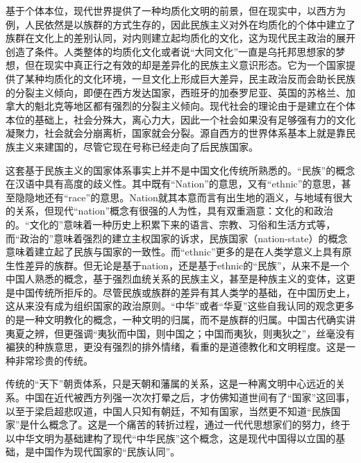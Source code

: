 \documentclass[UTF8, 12pt, a4paper]{ctexrep}
\begin{document}
基于个体本位，现代世界提供了一种均质化文明的前景，但在现实中，以西方为例，人民依然是以族群的方式生存的，因此民族主义对外在均质化的个体中建立了族群在文化上的差别认同，对内则建立起均质化的文化，这为现代民主政治的展开创造了条件。人类整体的均质化文化或者说“大同文化”一直是乌托邦思想家的梦想，但在现实中真正行之有效的却是差异化的民族主义意识形态。它为一个国家提供了某种均质化的文化环境，一旦文化上形成巨大差异，民主政治反而会助长民族的分裂主义倾向，即便在西方发达国家，西班牙的加泰罗尼亚、英国的苏格兰、加拿大的魁北克等地区都有强烈的分裂主义倾向。现代社会的理论由于是建立在个体本位的基础上，社会分殊大，离心力大，因此一个社会如果没有足够强有力的文化凝聚力，社会就会分崩离析，国家就会分裂。源自西方的世界体系基本上就是靠民族主义来建国的，尽管它现在号称已经走向了后民族国家。

这套基于民族主义的国家体系事实上并不是中国文化传统所熟悉的。“民族”的概念在汉语中具有高度的歧义性。其中既有“Nation”的意思，又有“ethnic”的意思，甚至隐隐地还有“race”的意思。Nation就其本意而言有出生地的涵义，与地域有很大的关系，但现代“nation”概念有很强的人为性，具有双重涵意：文化的和政治的。“文化的”意味着一种历史上积累下来的语言、宗教、习俗和生活方式等，而“政治的”意味着强烈的建立主权国家的诉求，民族国家（nation-state）的概念意味着建立起了民族与国家的一致性。而“ethnic”更多的是在人类学意义上具有原生性差异的族群。但无论是基于nation，还是基于ethnic的“民族”，从来不是一个中国人熟悉的概念，基于强烈血统关系的民族主义，甚至是种族主义的变体，这更是中国传统所拒斥的。尽管民族或族群的差异有其人类学的基础，在中国历史上，这从来没有成为组织国家的政治原则。“中华”或者“华夏”这些自我认同的观念更多的是一种文明教化的概念，一种文明的归属，而不是族群的归属。中国古代确实讲夷夏之辨，但更强调“夷狄而中国，则中国之；中国而夷狄，则夷狄之”，丝毫没有褊狭的种族意思，更没有强烈的排外情绪，看重的是道德教化和文明程度。这是一种非常珍贵的传统。

传统的“天下”朝贡体系，只是天朝和藩属的关系，这是一种离文明中心远近的关系。中国在近代被西方列强一次次打晕之后，才仿佛知道世间有了“国家”这回事，以至于梁启超悲叹道，中国人只知有朝廷，不知有国家，当然更不知道“民族国家”是什么概念了。这是一个痛苦的转折过程，通过一代代思想家们的努力，终于以中华文明为基础建构了现代“中华民族”这个概念，这是现代中国得以立国的基础，是中国作为现代国家的“民族认同”。
\end{document}
